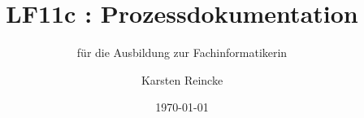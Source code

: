 \documentclass[]{beamer}
\title{LF11c : Prozessdokumentation}
\subtitle{für die Ausbildung zur Fachinformatikerin}
\institute{GS-LDK}
\author{Karsten Reincke}
\date{\today}
\def\cfgGl{../../../cfg.gl/}
\begin{document}

\begin{frame}
  \titlepage
\end{frame}







\logo{}
\newpage



%
\end{document}
